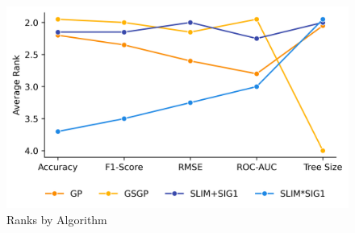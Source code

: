 
    \begin{figure}[H]
    \centering
    \includegraphics[width=\linewidth]{../Latex/Chapters/Figures/Results/comparison_ranks.png}
    \caption{Ranks by Algorithm}
    \label{fig:comparison_ranks}
    \end{figure}
    